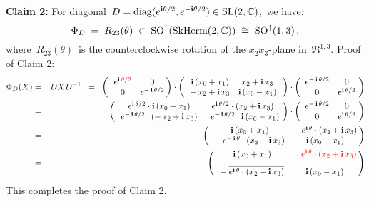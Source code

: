 \begin{enumerate}
	\vskip 0.3cm
	\noindent
	\textbf{Claim 2:}\quad
	For diagonal
	\,$D = \textnormal{diag}(e^{\textnormal{\bf i}\theta/2},e^{-\textnormal{\bf i}\theta/2}) \in \textnormal{SL}(2,\mathbb{C})$,\,
	we have:
	\begin{equation*}
	\Phi_{D}
	\; = \;
		R_{23}(\theta)
	\; \in \;
		\textnormal{SO}^{\uparrow}(\textnormal{SkHerm}(2,\mathbb{C}))
	\; \cong \;
		\textnormal{SO}^{\uparrow}(1,3)\,,
	\end{equation*}
	where
	\,$R_{23}(\theta)$\,
	is the counterclockwise rotation of the
	$x_{2}x_{3}$-plane in \,$\Re^{1,3}$.
	\vskip 0.1cm
	\noindent
	Proof of Claim 2:\;\;
	\begin{eqnarray*}
	\Phi_{D}(X)
	& = &
		DXD^{-1}
	\;\; = \;\;
		\left(\,\begin{array}{cc}
			e^{\i\,{\color{red}\theta/2}} & 0
			\\
			0 & e^{-\,\i\,\theta/2}
			\end{array}\!\!\right)
		\cdot
		\left(\,\begin{array}{cc}
			\i\,(x_{0}+x_{1}) & x_{2} + \i\,x_{3}
			\\
			- \, x_{2} + \i\,x_{3} & \i\,(x_{0}-x_{1})
			\end{array}\,\right)
		\cdot
		\left(\begin{array}{cc}
			e^{-\,\i\,\theta/2} & 0
			\\
			0 & e^{\i\,\theta/2}
			\end{array}\!\right)
	\\
	& = &
		\left(\,\begin{array}{cc}
			e^{\i\,\theta/2} \cdot \i\,(x_{0}+x_{1}) & e^{\i\,\theta/2} \cdot (x_{2} + \i\,x_{3})
			\\
			e^{-\,\i\,\theta/2} \cdot (-\,x_{2} + \i\,x_{3}) & \;\; e^{-\,\i\,\theta/2} \cdot \i\,(x_{0}-x_{1})
			\end{array}\!\right)
		\cdot
		\left(\begin{array}{cc}
			e^{-\,\i\,\theta/2} & 0
			\\
			0 & e^{\i\,\theta/2}
			\end{array}\!\right)
	\\
	& = &
		\left(\,\begin{array}{cc}
			\i\,(x_{0}+x_{1}) & \quad{\color{black}e^{\i\,\theta} \cdot (x_{2} + \i\,x_{3})}
			\\
			-\,e^{-\,\i\,\theta} \cdot (x_{2} - \i\,x_{3}) & \i\,(x_{0}-x_{1})
			\end{array}\!\!\right)
	\\
	& = &
		\left(\,\begin{array}{cc}
			\i\,(x_{0}+x_{1}) & \quad{\color{red}e^{\i\,\theta} \cdot (x_{2} + \i\,x_{3})}
			\\
			\overset{{\color{white}1}}{-\;\overline{e^{\i\,\theta} \cdot (x_{2} + \i\,x_{3})}} & \i\,(x_{0}-x_{1})
			\end{array}\!\!\right)
	\end{eqnarray*}
	This completes the proof of Claim 2.


\end{enumerate}
